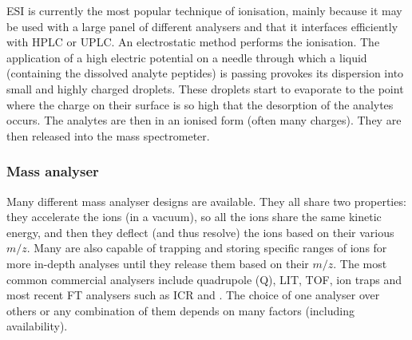 \gls{ESI} is currently the most popular technique of ionisation, mainly
because it may be used with a large panel of different analysers and that it
interfaces efficiently with \gls{HPLC} or \gls{UPLC}. An electrostatic method
performs the ionisation. The application of a high electric potential on
a needle through which a liquid (containing the dissolved analyte peptides)
is passing provokes its dispersion into small and highly charged droplets.
These droplets start to evaporate to the point where the charge on their surface
is so high that the desorption of the analytes occurs.  The analytes are then
in an ionised form (often many charges). They are then released into the mass
spectrometer. \mybr\

\subsubsection{Mass analyser}

Many different mass analyser designs are available. They all share two properties:
they accelerate the ions (in a vacuum), so all the ions share the same kinetic
energy, and then they deflect (and thus resolve) the ions based on
their various $m/z$. Many are also
capable of trapping and storing specific ranges of ions for more in-depth analyses until
they release them based on their $m/z$.
The most common commercial analysers include quadrupole (Q), \acrfull{LIT},
\acrfull{TOF}, ion traps and most recent \gls{FT} analysers such as \acrfull{ICR}
and \orbi.
The choice of one analyser over others or any combination of them
depends on many factors (including availability).~\mybr\

